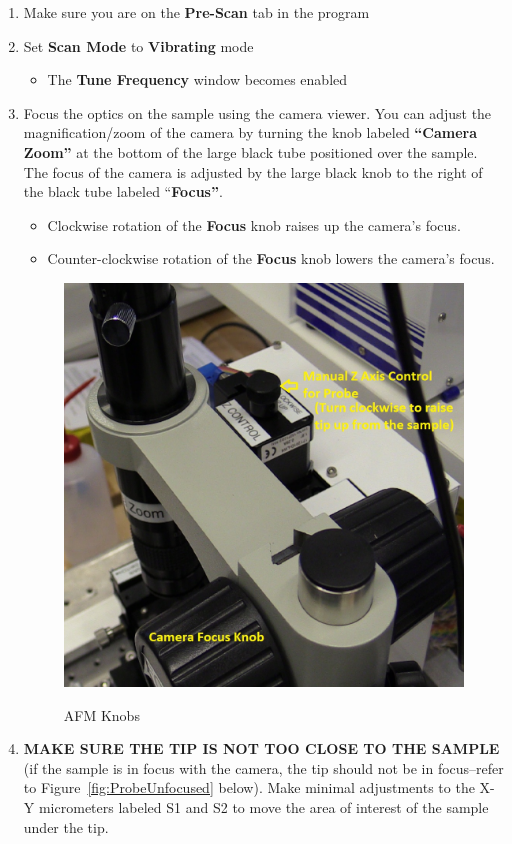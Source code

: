 \documentclass{../lab}
\begin{document}
\begin{enumerate}
    \item Make sure you are on the \textbf{Pre-Scan} tab in the program
    
    \item Set \textbf{Scan Mode} to \textbf{Vibrating} mode
    \begin{itemize}
        \item The \textbf{Tune Frequency} window becomes enabled
    \end{itemize}

    \item Focus the optics on the sample using the camera viewer.  You can adjust the magnification/zoom of the camera by turning the knob labeled\textbf{ ``Camera Zoom''} at the bottom of the large black tube positioned over the sample.  The focus of the camera is adjusted by the large black knob to the right of the black tube labeled ``\textbf{Focus''}.
    \begin{itemize}
        \item Clockwise rotation of the \textbf{Focus} knob raises up the camera's focus.
        \item Counter-clockwise rotation of the \textbf{Focus} knob lowers the camera's focus.
    \end{itemize}

    \begin{figure}[H]
        \centering
        \href{http://experimentationlab.berkeley.edu/sites/default/files/AFMImages/ZControl.jpg}{\includegraphics[width=0.5\linewidth]{images/ZControl.jpg}}
        \caption{AFM Knobs}
    \end{figure}
    
    \item\textbf{MAKE SURE THE TIP IS NOT TOO CLOSE TO THE SAMPLE} (if the sample is in focus with the camera, the tip should not be in focus--refer to Figure~\ref{fig:ProbeUnfocused} below). Make minimal adjustments to the X-Y micrometers labeled S1 and S2 to move the area of interest of the sample under the tip.
    
\end{enumerate}
\end{document}

